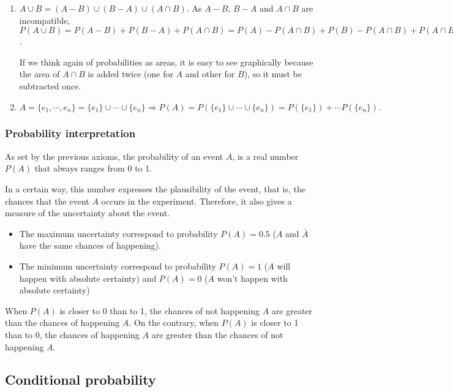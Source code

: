 \begin{frame}
{\begin{enumerate}
\item $A\cup B= (A-B) \cup (B-A) \cup (A\cap B)$. As $A-B$, $B-A$ and $A\cap B$ are incompatible, $P(A\cup
B)=P(A-B)+P(B-A)+P(A\cap B) = P(A)-P(A\cap B)+P(B)-P(A\cap B)+P(A\cap B)= P(A)+P(B)-P(A\cup B)$.

If we think again of probabilities as areas, it is easy to see graphically because the area of $A\cap B$ is added twice (one for $A$ and other for $B$), so it must be subtracted once. 
\begin{center}

\end{center}
\item $A=\{e_1,\cdots,e_n\} = \{e_1\}\cup \cdots \cup \{e_n\} \Rightarrow P(A)=P(\{e_1\}\cup \cdots \cup \{e_n\}) =
P(\{e_1\})+ \cdots P(\{e_n\}).$
\end{enumerate}
}
\end{frame}


\begin{frame}
\frametitle{Probability interpretation}
As set by the previous axioms, the probability of an event $A$, is a real number $P(A)$ that always ranges from 0 to 1. 

In a certain way, this number expresses the plausibility of the event, that is, the chances that the event $A$ occurs in the experiment.
Therefore, it also gives a measure of the uncertainty about the event.
\begin{itemize}
\item The maximum uncertainty correspond to probability $P(A)=0.5$ ($A$ and $\overline A$ have the same chances of happening).
\item The minimum uncertainty correspond to probability $P(A)=1$ ($A$ will happen with absolute certainty) and $P(A)=0$ ($A$ won't happen with absolute certainty)
\end{itemize} 

When $P(A)$ is closer to 0 than to 1, the chances of not happening $A$ are greater than the chances of happening $A$.
On the contrary, when $P(A)$ is closer to 1 than to 0, the chances of happening $A$ are greater than the chances of not happening $A$.
\end{frame}


\subsection{Conditional probability}

